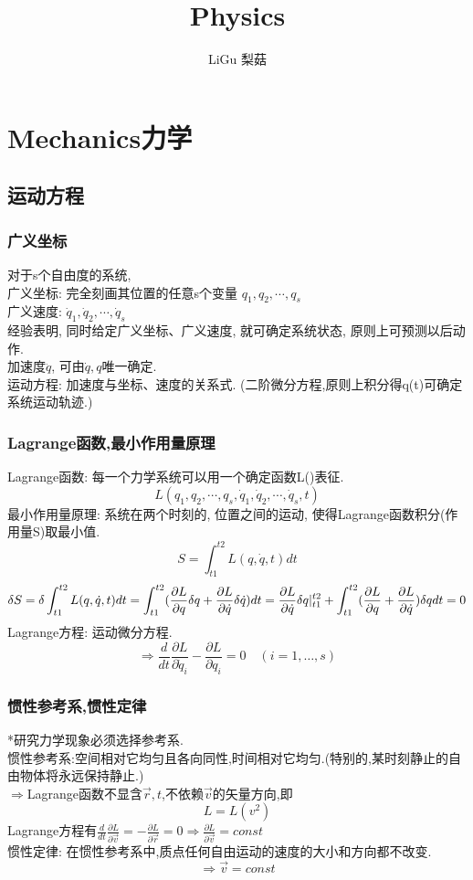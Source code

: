 \documentclass{article}
\title{Physics}\author{LiGu 梨菇}\date{}
\begin{document}
\maketitle

\section{Mechanics力学}

\subsection{运动方程}

\subsubsection{广义坐标}
对于s个自由度的系统,\\
广义坐标: 完全刻画其位置的任意s个变量 $q_{1},q_{2},\cdots,q_{s}$\\
广义速度: $\dot q_{1},\dot q_{2},\cdots,\dot q_{s}$\\
经验表明, 同时给定广义坐标、广义速度, 就可确定系统状态, 原则上可预测以后动作.\\
加速度$\ddot q$, 可由$\dot q,q$唯一确定.\\
运动方程: 加速度与坐标、速度的关系式. (二阶微分方程,原则上积分得q(t)可确定系统运动轨迹.)


\subsubsection{Lagrange函数,最小作用量原理}
Lagrange函数: 每一个力学系统可以用一个确定函数L()表征.
\[L(q_{1},q_{2},\cdots,q_{s},\dot q_{1},\dot q_{2},\cdots,\dot q_{s},t)\]
最小作用量原理: 系统在两个时刻的, 位置之间的运动, 使得Lagrange函数积分(作用量S)取最小值.
\[S = \int_{t1}^{t2} L(q,\dot q,t)dt\]
\[\delta S = \delta \int_{t1}^{t2} L(q,\dot q,t)dt
 = \int_{t1}^{t2} (\frac{\partial L}{\partial q}\delta q + \frac{\partial L}{\partial \dot q}\delta \dot q) dt
 = \frac{\partial L}{\partial \dot q} \delta q \arrowvert_{t1}^{t2}
 + \int_{t1}^{t2} (\frac{\partial L}{\partial q} + \frac{\partial L}{\partial \dot q}) \delta q dt
 = 0\]
Lagrange方程: 运动微分方程. 
\[\Rightarrow \frac{d}{dt}\frac{\partial L}{\partial \dot q_{i}} - \frac{\partial L}{\partial q_{i}} = 0\quad(i=1,\dots,s)\]


\subsubsection{惯性参考系,惯性定律}
*研究力学现象必须选择参考系.\\
惯性参考系:空间相对它均匀且各向同性,时间相对它均匀.(特别的,某时刻静止的自由物体将永远保持静止.)\\
$\Rightarrow$Lagrange函数不显含$\vec r,t$,不依赖$\vec v$的矢量方向,即
\[L = L(v^{2})\]
Lagrange方程有$\frac{d}{dt}\frac{\partial L}{\partial \vec v} = -\frac{\partial L}{\partial \vec r} = 0\Rightarrow\frac{\partial L}{\partial \vec v}=const$\\
惯性定律: 在惯性参考系中,质点任何自由运动的速度的大小和方向都不改变.
\[\Rightarrow \vec v = const\]
\end{document}
